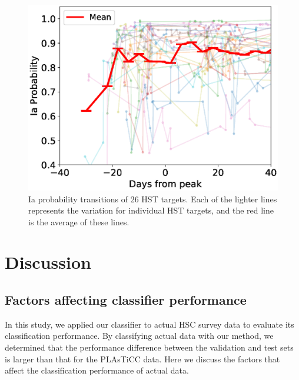 \documentclass[proof]{pasj01}
\begin{document}
%
%
\begin{figure}[htbp]
  \begin{center}
     \includegraphics[width=\columnwidth]{figures/HST_DaysFromPeak_vs_IaProbability_200319.eps}
  \end{center}
  \caption{%
  Ia probability transitions of 26 HST targets. Each of the lighter lines represents the variation for individual HST targets, and the red line is the average of these lines.
  }%
  \label{fig:HSTIaprob}
\end{figure}
%
%
\section{Discussion}
%
\subsection{Factors affecting classifier performance}
%
In this study, we applied our classifier to actual HSC survey data to evaluate its classification performance.
By classifying actual data with our method, we determined that the performance difference between the validation and test sets is larger than that for the PLAsTiCC data.
Here we discuss the factors that affect the classification performance of actual data.
\end{document}

